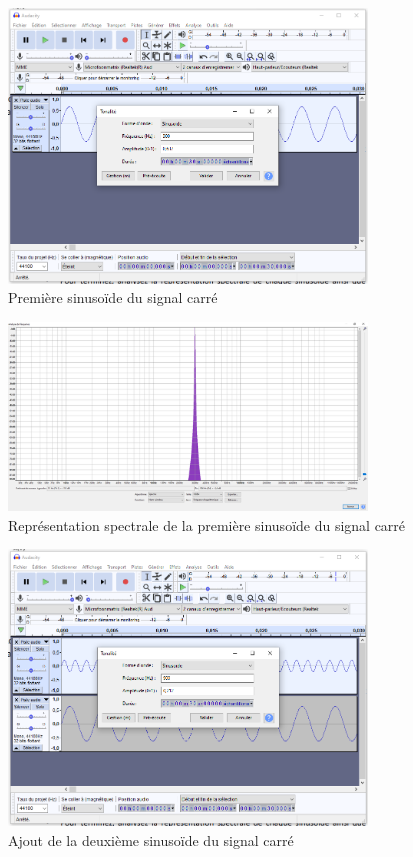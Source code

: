 \documentclass[a4paper]{article}
\begin{document}
\begin{figure}[H]
    \centering
    \includegraphics[width=0.85\textwidth]{images/SignalCarre005.PNG}
    \caption{Première sinusoïde du signal carré}
    \label{fig:SignalCarre005}
\end{figure}

\begin{figure}[H]
    \centering
    \includegraphics[width=0.85\textwidth]{images/SignalCarre021.PNG}
    \caption{Représentation spectrale de la première sinusoïde du signal carré}
    \label{fig:SignalCarre021}
\end{figure}


\begin{figure}[H]
    \centering
    \includegraphics[width=0.85\textwidth]{images/SignalCarre009.PNG}
    \caption{Ajout de la deuxième sinusoïde du signal carré}
    \label{fig:SignalCarre009}
\end{figure}
\end{document}

